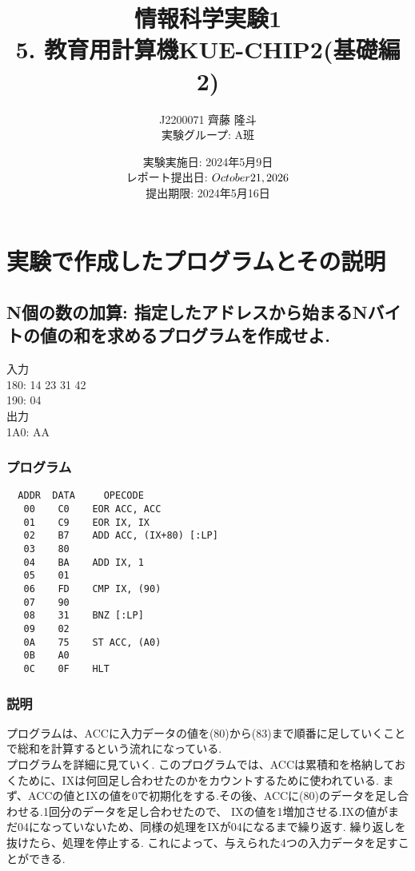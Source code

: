 \documentclass[titlepage]{jsarticle}
\title{情報科学実験1 \\ 5. 教育用計算機KUE-CHIP2(基礎編2)}
\author{J2200071 齊藤 隆斗 \\ 実験グループ: A班}
\date{実験実施日: 2024年5月9日 \\ レポート提出日: $\today$ \\ 提出期限: 2024年5月16日}
\theoremstyle{definition}
\begin{document}
\maketitle

\section{実験で作成したプログラムとその説明}

\subsection{N個の数の加算: 指定したアドレスから始まるNバイトの値の和を求めるプログラムを作成せよ.}
入力 \\
180: 14 23 31 42 \\
190: 04 \\

出力 \\
1A0: AA \\

\subsubsection{プログラム}

\begin{lstlisting}
  ADDR  DATA     OPECODE
   00    C0    EOR ACC, ACC
   01    C9    EOR IX, IX
   02    B7    ADD ACC, (IX+80) [:LP]
   03    80
   04    BA    ADD IX, 1
   05    01
   06    FD    CMP IX, (90)
   07    90
   08    31    BNZ [:LP]
   09    02
   0A    75    ST ACC, (A0)
   0B    A0
   0C    0F    HLT
\end{lstlisting}

\subsubsection{説明}
プログラムは、ACCに入力データの値を(80)から(83)まで順番に足していくことで総和を計算するという流れになっている. \\
プログラムを詳細に見ていく.
このプログラムでは、ACCは累積和を格納しておくために、IXは何回足し合わせたのかをカウントするために使われている.
まず、ACCの値とIXの値を0で初期化をする.その後、ACCに(80)のデータを足し合わせる.1回分のデータを足し合わせたので、
IXの値を1増加させる.IXの値がまだ04になっていないため、同様の処理をIXが04になるまで繰り返す.
繰り返しを抜けたら、処理を停止する.
これによって、与えられた4つの入力データを足すことができる.
\end{document}
